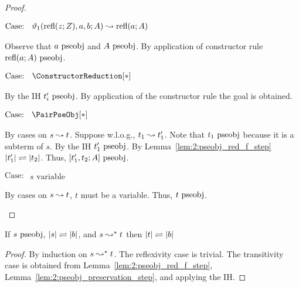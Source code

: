 \begin{proof}
\begin{proofcase}
        $\text{Case: }\begin{array}{c} \vartheta_1(\text{refl}(z; Z), a, b; A) \leadsto \text{refl}(a; A) \end{array}$
        \begin{proofcase}
            Observe that $a~\textnormal{pseobj}$ and $A~\textnormal{pseobj}$.
            By application of constructor rule $\text{refl}(a; A)~\textnormal{pseobj}$.
        \end{proofcase}

        $\text{Case: }\begin{array}{c} \ConstructorReduction[*] \end{array}$
        \begin{proofcase}
            By the IH $t_i^\prime~\textnormal{pseobj}$.
            By application of the constructor rule the goal is obtained.
        \end{proofcase}
    \end{proofcase}

    $\text{Case: }\begin{array}{c} \PairPseObj[*] \end{array}$
    \begin{proofcase}
        By cases on $s \leadsto t$.
        Suppose w.l.o.g., $t_1 \leadsto t_1^\prime$.
        Note that $t_1~\textnormal{pseobj}$ because it is a subterm of $s$.
        By the IH $t_1^\prime~\textnormal{pseobj}$.
        By Lemma~\ref{lem:2:pseobj_red_f_step} $|t_1^\prime| \rightleftharpoons |t_2|$.
        Thus, $[t_1^\prime, t_2; A]~\textnormal{pseobj}$.
    \end{proofcase}

    $\text{Case: }\begin{array}{c} s\text{ variable} \end{array}$
    \begin{proofcase}
        By cases on $s \leadsto t$, $t$ must be a variable.
        Thus, $t~\textnormal{pseobj}$.
    \end{proofcase}
\end{proof}

\begin{lemma}
    \label{lem:2:pseobj_red_f}
    If $s~\textnormal{pseobj}$, $|s| \rightleftharpoons |b|$, and $s \leadsto^* t$ then $|t| \rightleftharpoons |b|$
\end{lemma}
\begin{proof}
    By induction on $s \leadsto^* t$.
    The reflexivity case is trivial.
    The transitivity case is obtained from Lemma~\ref{lem:2:pseobj_red_f_step}, Lemma~\ref{lem:2:pseobj_preservation_step}, and applying the IH.
\end{proof}

